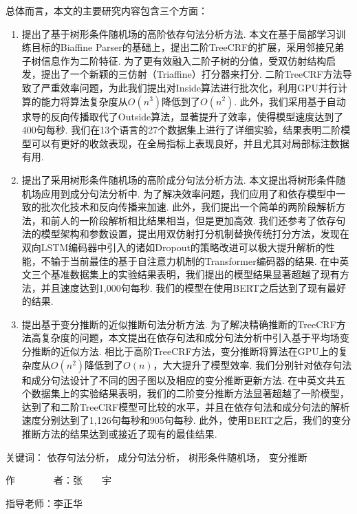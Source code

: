 \begin{cabstract}
  总体而言，本文的主要研究内容包含三个方面：
  \begin{enumerate}
    \item 提出了基于树形条件随机场的高阶依存句法分析方法.
          本文在基于局部学习训练目标的Biaffine Parser的基础上，提出二阶TreeCRF的扩展，采用邻接兄弟子树信息作为二阶特征.
          为了更有效融入二阶子树的分值，受双仿射结构启发，提出了一个新颖的三仿射（Triaffine）打分器来打分.
          二阶TreeCRF方法导致了严重效率问题，为此我们提出对Inside算法进行批次化，利用GPU并行计算的能力将算法复杂度从$O(n^3)$降低到了$O(n^2)$.
          此外，我们采用基于自动求导的反向传播取代了Outside算法，显著提升了效率，使得模型速度达到了400句每秒.
          我们在13个语言的27个数据集上进行了详细实验，结果表明二阶模型可以有更好的收敛表现，在全局指标上表现良好，并且尤其对局部标注数据有用.
    \item 提出了采用树形条件随机场的高阶成分句法分析方法.
          本文提出将树形条件随机场应用到成分句法分析中.
          为了解决效率问题，我们应用了和依存模型中一致的批次化技术和反向传播来加速.
          此外，我们提出一个简单的两阶段解析方法，和前人的一阶段解析相比结果相当，但是更加高效.
          我们还参考了依存句法的模型架构和参数设置，提出用双仿射打分机制替换传统打分方法，发现在双向LSTM编码器中引入的诸如Dropout的策略改进可以极大提升解析的性能，不输于当前最佳的基于自注意力机制的Transformer编码器的结果.
          在中英文三个基准数据集上的实验结果表明，我们提出的模型结果显著超越了现有方法，并且速度达到1,000句每秒.
          我们的模型在使用BERT之后达到了现有最好的结果.
    \item 提出基于变分推断的近似推断句法分析方法.
          为了解决精确推断的TreeCRF方法高复杂度的问题，本文提出在依存句法和成分句法分析中引入基于平均场变分推断的近似方法.
          相比于高阶TreeCRF方法，变分推断将算法在GPU上的复杂度从$O(n^2)$降低到了$O(n)$，大大提升了模型效率.
          我们分别针对依存句法和成分句法设计了不同的因子图以及相应的变分推断更新方法.
          在中英文共五个数据集上的实验结果表明，我们的二阶变分推断方法显著超越了一阶模型，达到了和二阶TreeCRF模型可比较的水平，并且在依存句法和成分句法的解析速度分别达到了1,126句每秒和905句每秒.
          此外，使用BERT之后，我们的变分推断方法的结果达到或接近了现有的最佳结果.
  \end{enumerate}



  \vskip 21bp
    {\heiti{} 关键词：}
  依存句法分析，
  成分句法分析，
  树形条件随机场，
  变分推断

  \begin{flushright}
    作~~~~~~~~者：张~~~~宇

    指导老师：李正华

  \end{flushright}
\end{cabstract}


